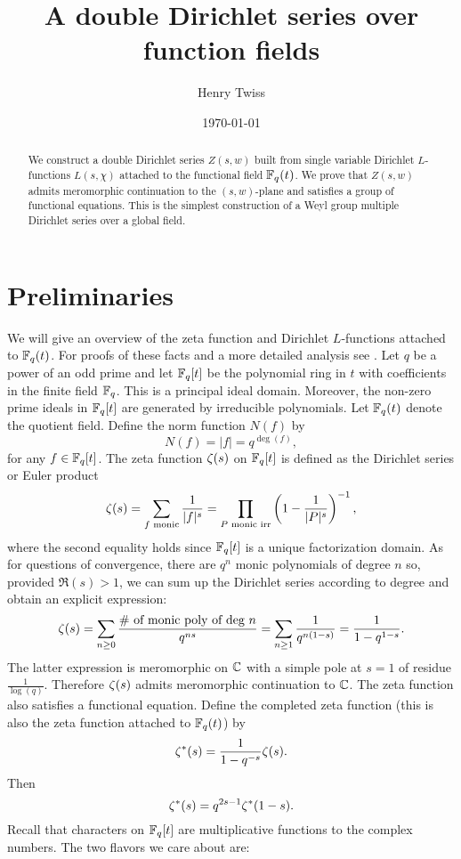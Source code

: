 \documentclass[12pt,reqno,oneside]{amsart}
\title{A double Dirichlet series over function fields}
\author{Henry Twiss}
\date{\today}
\begin{document}
\begin{abstract}
    We construct a double Dirichlet series $Z(s,w)$ built from single variable Dirichlet $L$-functions $L(s,\chi)$ attached to the functional field $\mathbb{F}_{q}(t)$. We prove that $Z(s,w)$ admits meromorphic continuation to the $(s,w)$-plane and satisfies a group of functional equations. This is the simplest construction of a Weyl group multiple Dirichlet series over a global field.
\end{abstract}

\maketitle

\section{Preliminaries}
    We will give an overview of the zeta function and Dirichlet $L$-functions attached to $\mathbb{F}_{q}(t)$. For proofs of these facts and a more detailed analysis see \cite{R}. Let $q$ be a power of an odd prime and let $\mathbb{F}_{q}[t]$ be the polynomial ring in $t$ with coefficients in the finite field $\mathbb{F}_{q}$. This is a principal ideal domain. Moreover, the non-zero prime ideals in $\mathbb{F}_{q}[t]$ are generated by irreducible polynomials. Let $\mathbb{F}_{q}(t)$ denote the quotient field. Define the norm function $N(f)$ by
    \[
        N(f) = |f| = q^{\deg(f)},
    \]
    for any $f \in \mathbb{F}_{q}[t]$. The zeta function $\zeta(s)$ on $\mathbb{F}_{q}[t]$ is defined as the Dirichlet series or Euler product
    \[
        \zeta(s) = \sum_{\text{$f$ monic}}\frac{1}{|f|^{s}} = \prod_{\text{$P$ monic irr}}\left(1-\frac{1}{|P|^{s}}\right)^{-1},
    \]
    where the second equality holds since $\mathbb{F}_{q}[t]$ is a unique factorization domain. As for questions of convergence, there are $q^{n}$ monic polynomials of degree $n$ so, provided $\Re(s) > 1$, we can sum up the Dirichlet series according to degree and obtain an explicit expression:
    \[
        \zeta(s) = \sum_{n \ge 0}\frac{\text{\# of monic poly of deg $n$}}{q^{ns}} = \sum_{n \ge 1}\frac{1}{q^{n(1-s)}} = \frac{1}{1-q^{1-s}}.
    \]
    The latter expression is meromorphic on $\mathbb{C}$ with a simple pole at $s = 1$ of residue $\frac{1}{\log(q)}$. Therefore $\zeta(s)$ admits meromorphic continuation to $\mathbb{C}$. The zeta function also satisfies a functional equation. Define the completed zeta function (this is also the zeta function attached to $\mathbb{F}_{q}(t)$) by
    \[
        \zeta^{\ast}(s) = \frac{1}{1-q^{-s}}\zeta(s).
    \]
    Then
    \[
        \zeta^{\ast}(s) = q^{2s-1}\zeta^{\ast}(1-s).
    \]
    Recall that characters on $\mathbb{F}_{q}[t]$ are multiplicative functions to the complex numbers. The two flavors we care about are:
    
\end{document}
